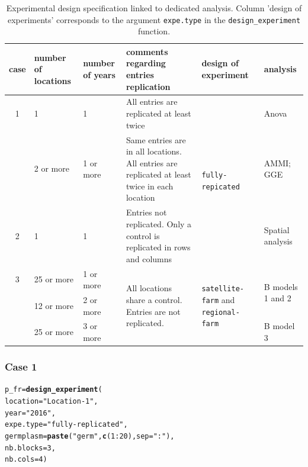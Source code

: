 \documentclass{article}\usepackage[]{graphicx}\usepackage[]{color}
\makeatletter
\newcommand{\hlnum}[1]{\textcolor[rgb]{0.686,0.059,0.569}{#1}}%
\newcommand{\hlstr}[1]{\textcolor[rgb]{0.192,0.494,0.8}{#1}}%
\newcommand{\hlopt}[1]{\textcolor[rgb]{0,0,0}{#1}}%
\newcommand{\hlstd}[1]{\textcolor[rgb]{0.345,0.345,0.345}{#1}}%
\newcommand{\hlkwb}[1]{\textcolor[rgb]{0.69,0.353,0.396}{#1}}%
\newcommand{\hlkwc}[1]{\textcolor[rgb]{0.333,0.667,0.333}{#1}}%
\newcommand{\hlkwd}[1]{\textcolor[rgb]{0.737,0.353,0.396}{\textbf{#1}}}%
\newenvironment{kframe}{%
 \def\at@end@of@kframe{}%
 \ifinner\ifhmode%
  \def\at@end@of@kframe{\end{minipage}}%
  \begin{minipage}{\columnwidth}%
 \fi\fi%
 \def\FrameCommand##1{\hskip\@totalleftmargin \hskip-\fboxsep
 \colorbox{shadecolor}{##1}\hskip-\fboxsep
     \hskip-\linewidth \hskip-\@totalleftmargin \hskip\columnwidth}%
 \MakeFramed {\advance\hsize-\width
   \@totalleftmargin\z@ \linewidth\hsize
   \@setminipage}}%
 {\par\unskip\endMakeFramed%
 \at@end@of@kframe}
\newenvironment{knitrout}{}{} %
\makeatother
\begin{document}
\begin{table}[H]
\begin{tabular}{
c
p{}
p{}
p{}
p{}
p{}
}
\hline
case & number of locations & number of years & comments regarding entries replication & design of experiment & analysis \\
\hline
1 & 1 & 1 & All entries are replicated at least twice & \multirow{3}{.2\textwidth}{\texttt{fully-repicated}} & Anova \\
\cline{2-4}\cline{6-6}
  & 2 or more & 1 or more & Same entries are in all locations. All entries are replicated at least twice in each location & & AMMI; GGE \\
\hline
2 & 1 & 1 & Entries not replicated. Only a control is replicated in rows and columns & \texttt{row-column} & Spatial analysis \\
\hline
3 & 25 or more & 1 or more & \multirow{3}{.35\textwidth}{All locations share a control. Entries are not replicated.} & \multirow{3}{.2\textwidth}{\texttt{satellite-farm} and \texttt{regional-farm}} & \multirow{2}{.1\textwidth}{B models 1 and 2} \\
  & 12 or more & 2 or more & & & \\
  \cline{2-3} \cline{6-6}
  & 25 or more & 3 or more & & & B model 3 \\
\hline
\end{tabular}
\caption{Experimental design specification linked to dedicated analysis. Column 'design of experiments' corresponds to the argument \texttt{expe.type} in the \texttt{design\_experiment} function.}
\label{cases_expe}
\end{table}


\subsubsection{Case 1}
\begin{knitrout}
\color{fgcolor}\begin{kframe}
\begin{alltt}
\hlstd{p_fr} \hlkwb{=} \hlkwd{design_experiment}\hlstd{(}
  \hlkwc{location} \hlstd{=} \hlstr{"Location-1"}\hlstd{,}
  \hlkwc{year} \hlstd{=} \hlstr{"2016"}\hlstd{,}
  \hlkwc{expe.type} \hlstd{=} \hlstr{"fully-replicated"}\hlstd{,}
  \hlkwc{germplasm} \hlstd{=} \hlkwd{paste}\hlstd{(}\hlstr{"germ"}\hlstd{,} \hlkwd{c}\hlstd{(}\hlnum{1}\hlopt{:}\hlnum{20}\hlstd{),} \hlkwc{sep} \hlstd{=} \hlstr{":"}\hlstd{),}
  \hlkwc{nb.blocks} \hlstd{=} \hlnum{3}\hlstd{,}
  \hlkwc{nb.cols} \hlstd{=} \hlnum{4}\hlstd{)}
\end{alltt}
\end{kframe}
\end{knitrout}
\end{document}
